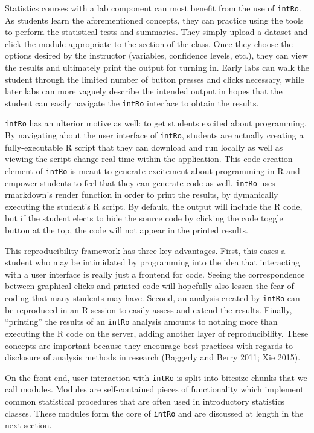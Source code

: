 \documentclass[12pt,]{article}
\begin{document}
Statistics courses with a lab component can most benefit from the use of
\texttt{intRo}. As students learn the aforementioned concepts, they can
practice using the tools to perform the statistical tests and summaries.
They simply upload a dataset and click the module appropriate to the
section of the class. Once they choose the options desired by the
instructor (variables, confidence levels, etc.), they can view the
results and ultimately print the output for turning in. Early labs can
walk the student through the limited number of button presses and clicks
necessary, while later labs can more vaguely describe the intended
output in hopes that the student can easily navigate the \texttt{intRo}
interface to obtain the results.

\texttt{intRo} has an ulterior motive as well: to get students excited
about programming. By navigating about the user interface of
\texttt{intRo}, students are actually creating a fully-executable R
script that they can download and run locally as well as viewing the
script change real-time within the application. This code creation
element of \texttt{intRo} is meant to generate excitement about
programming in R and empower students to feel that they can generate
code as well. \texttt{intRo} uses rmarkdown's render function in order
to print the results, by dymanically executing the student's R script.
By default, the output will include the R code, but if the student
elects to hide the source code by clicking the code toggle button at the
top, the code will not appear in the printed results.

This reproducibility framework has three key advantages. First, this
eases a student who may be intimidated by programming into the idea that
interacting with a user interface is really just a frontend for code.
Seeing the correspondence between graphical clicks and printed code will
hopefully also lessen the fear of coding that many students may have.
Second, an analysis created by \texttt{intRo} can be reproduced in an R
session to easily assess and extend the results. Finally, ``printing''
the results of an \texttt{intRo} analysis amounts to nothing more than
executing the R code on the server, adding another layer of
reproducibility. These concepts are important because they encourage
best practices with regards to disclosure of analysis methods in
research (Baggerly and Berry 2011; Xie 2015).

On the front end, user interaction with \texttt{intRo} is split into
bitesize chunks that we call modules. Modules are self-contained pieces
of functionality which implement common statistical procedures that are
often used in introductory statistics classes. These modules form the
core of \texttt{intRo} and are discussed at length in the next section.
\end{document}
